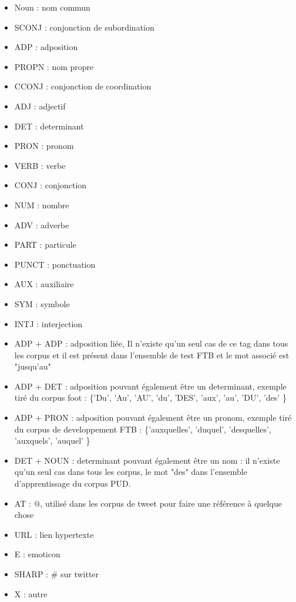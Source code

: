 \documentclass[french, 14pt]{memoir}
\begin{document}
\begin{itemize}
\item Noun : nom commun
\item SCONJ : conjonction de subordination
\item ADP : adposition
\item PROPN : nom propre
\item CCONJ : conjonction de coordination
\item ADJ : adjectif
\item DET : determinant
\item PRON : pronom
\item VERB : verbe
\item CONJ : conjonction
\item NUM : nombre
\item ADV : adverbe
\item PART : particule
\item PUNCT : ponctuation
\item AUX : auxiliaire
\item SYM : symbole
\item INTJ : interjection
\item ADP + ADP : adposition liée, Il n'existe qu'un seul cas de ce tag dans tous les corpus et il est présent dans l'ensemble de test FTB et le mot associé est "jusqu'au"
\item ADP + DET : adposition pouvant également être un determinant, exemple tiré du corpus foot : \{'Du', 'Au', 'AU', 'du', 'DES', 'aux', 'au', 'DU', 'des' \}
\item ADP + PRON : adposition pouvant également être un pronom, exemple tiré du corpus de developpement FTB : \{'auxquelles', 'duquel', 'desquelles', 'auxquels', 'auquel' \}
\item DET + NOUN : determinant pouvant également être un nom : il n'existe qu'un seul cas dans tous les corpus, le mot "des" dans l'ensemble d'apprentissage du corpus PUD.
\item AT : @, utilisé dans les corpus de tweet pour faire une référence à quelque chose
\item URL : lien hypertexte
\item E : emoticon
\item SHARP : \# sur twitter
\item X : autre
\end{itemize}
\end{document}
